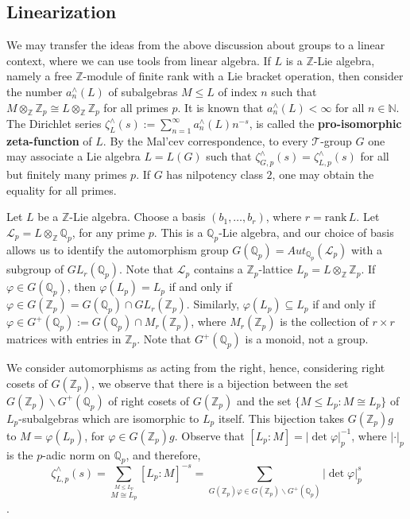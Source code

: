 \documentclass[12pt]{article}
\begin{document}
\subsection{Linearization}
We may transfer the ideas from the above discussion about groups to a linear context, where we can use tools from linear algebra.
If $L$ is a $\mathbb{Z}$-Lie algebra, namely a free $\mathbb{Z}$-module of finite rank with a Lie bracket operation, then consider the number $a_{n}^{\wedge}(L)$ of subalgebras $M\leq L$ of index $n$ such that $M\otimes_{\mathbb{Z}}\mathbb{Z}_p\cong L\otimes_{\mathbb{Z}}\mathbb{Z}_p$ for all primes $p$. It is known that $a_{n}^{\wedge}(L)<\infty$ for all $n\in\mathbb{N}$. The Dirichlet series $\zeta_{L}^{\wedge}(s):=\sum_{n=1}^{\infty}{a_{n}^{\wedge}}(L)n^{-s}$, is called the \textbf{pro-isomorphic zeta-function} of $L$. By the Mal'cev correspondence, to every $\mathcal{T}$-group $G$ one may associate a Lie algebra $L=L(G)$ such that $\zeta_{G,p}^{\wedge}(s)=\zeta_{L,p}^{\wedge}(s)$ for all but finitely many primes $p$. If $G$ has nilpotency class $2$, one may obtain the equality for all primes.\par
Let $L$ be a $\mathbb{Z}$-Lie algebra. Choose a basis $(b_1,\dots,b_r)$, where $r=\mathrm{rank}\,L$. Let $\mathcal{L}_{p}=L\otimes_{\mathbb{Z}}\mathbb{Q}_p$, for any prime $p$. This is a $\mathbb{Q}_p$-Lie algebra, and our choice of basis allows us to identify the automorphism group $G(\mathbb{Q}_p)=Aut_{\mathbb{Q}_p}(\mathcal{L}_{p})$ with a subgroup of $GL_r(\mathbb{Q}_p)$. Note that $\mathcal{L}_{p}$ contains a $\mathbb{Z}_p$-lattice $L_{p}=L\otimes_{\mathbb{Z}}\mathbb{Z}_p$. If $\varphi\in G(\mathbb{Q}_p)$, then $\varphi(L_{p})=L_{p}$ if and only if $\varphi\in G(\mathbb{Z}_p)=G(\mathbb{Q}_p)\cap GL_r(\mathbb{Z}_p)$. Similarly, $\varphi(L_{p})\subseteq L_{p}$ if and only if $\varphi\in G^{+}(\mathbb{Q}_p):=G(\mathbb{Q}_p)\cap {M}_r(\mathbb{Z}_p)$, where ${M}_r(\mathbb{Z}_p)$ is the collection of $r\times r$ matrices with entries in $\mathbb{Z}_p$. Note that $G^{+}(\mathbb{Q}_p)$ is a monoid, not a group.\par
We consider automorphisms as acting from the right, hence, considering right cosets of $G(\mathbb{Z}_p)$, we observe that there is a bijection between the set $G(\mathbb{Z}_p)\backslash G^{+}(\mathbb{Q}_p)$ of right cosets of $G(\mathbb{Z}_p)$ and the set $\{M\leq L_{p} : M\cong L_{p}\}$ of $L_{p}$-subalgebras which are isomorphic to $L_{p}$ itself. This bijection takes $G(\mathbb{Z}_p)g$ to $M=\varphi(L_{p})$, for $\varphi\in G(\mathbb{Z}_p)g$.
Observe that $[L_{p}:M]=|\det\varphi|_p^{-1}$, where $|\cdot|_p$ is the $p$-adic norm on $\mathbb{Q}_{p}$, and therefore,
\begin{equation}
\label{eq:proisomorphic.zeta}
\zeta_{L,p}^{\wedge}(s)=\underset{\overset{\scriptscriptstyle M\leq L_{p}}{\scriptscriptstyle M\cong L_{p}}}{\sum}[L_{p}:M]^{-s}=\underset{\scriptscriptstyle G(\mathbb{Z}_p)\varphi\in G(\mathbb{Z}_p)\backslash G^{+}(\mathbb{Q}_p)}{\sum}|\det\varphi|_p^s
\end{equation}.
\end{document}
